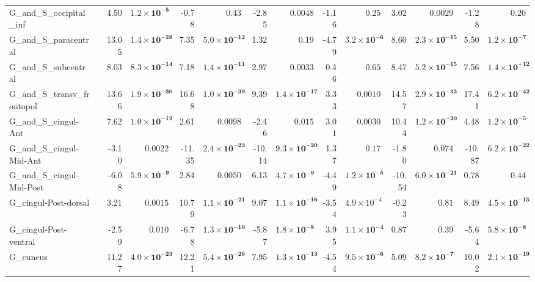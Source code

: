 {\begin{longtable}{llrrrrrrrrrrrr}
G\_and\_S\_occipital\_inf &  & 4.50 & $\mathbf{1.2{\times}10^{-5}}$ & -0.78 & $0.43$ & -2.85 & $0.0048$ & -1.16 & $0.25$ & 3.02 & $0.0029$ & -1.28 & $0.20$ \\
G\_and\_S\_paracentral &  & 13.05 & $\mathbf{1.4{\times}10^{-28}}$ & 7.35 & $\mathbf{5.0{\times}10^{-12}}$ & 1.32 & $0.19$ & -4.79 & $\mathbf{3.2{\times}10^{-6}}$ & 8.60 & $\mathbf{2.3{\times}10^{-15}}$ & 5.50 & $\mathbf{1.2{\times}10^{-7}}$ \\
G\_and\_S\_subcentral &  & 8.03 & $\mathbf{8.3{\times}10^{-14}}$ & 7.18 & $\mathbf{1.4{\times}10^{-11}}$ & 2.97 & $0.0033$ & 0.46 & $0.65$ & 8.47 & $\mathbf{5.2{\times}10^{-15}}$ & 7.56 & $\mathbf{1.4{\times}10^{-12}}$ \\
G\_and\_S\_transv\_frontopol &  & 13.66 & $\mathbf{1.9{\times}10^{-30}}$ & 16.68 & $\mathbf{1.0{\times}10^{-39}}$ & 9.39 & $\mathbf{1.4{\times}10^{-17}}$ & 3.33 & $0.0010$ & 14.57 & $\mathbf{2.9{\times}10^{-33}}$ & 17.41 & $\mathbf{6.2{\times}10^{-42}}$ \\
G\_and\_S\_cingul-Ant &  & 7.62 & $\mathbf{1.0{\times}10^{-12}}$ & 2.61 & $0.0098$ & -2.46 & $0.015$ & 3.01 & $0.0030$ & 10.44 & $\mathbf{1.2{\times}10^{-20}}$ & 4.48 & $\mathbf{1.2{\times}10^{-5}}$ \\
G\_and\_S\_cingul-Mid-Ant &  & -3.10 & $0.0022$ & -11.35 & $\mathbf{2.4{\times}10^{-23}}$ & -10.14 & $\mathbf{9.3{\times}10^{-20}}$ & 1.37 & $0.17$ & -1.80 & $0.074$ & -10.87 & $\mathbf{6.2{\times}10^{-22}}$ \\
G\_and\_S\_cingul-Mid-Post &  & -6.08 & $\mathbf{5.9{\times}10^{-9}}$ & 2.84 & $0.0050$ & 6.13 & $\mathbf{4.7{\times}10^{-9}}$ & -4.49 & $\mathbf{1.2{\times}10^{-5}}$ & -10.54 & $\mathbf{6.0{\times}10^{-21}}$ & 0.78 & $0.44$ \\
G\_cingul-Post-dorsal &  & 3.21 & $0.0015$ & 10.79 & $\mathbf{1.1{\times}10^{-21}}$ & 9.07 & $\mathbf{1.1{\times}10^{-16}}$ & -3.54 & $4.9{\times}10^{-4}$ & -0.23 & $0.81$ & 8.49 & $\mathbf{4.5{\times}10^{-15}}$ \\
G\_cingul-Post-ventral &  & -2.59 & $0.010$ & -6.78 & $\mathbf{1.3{\times}10^{-10}}$ & -5.87 & $\mathbf{1.8{\times}10^{-8}}$ & 3.95 & $\mathbf{1.1{\times}10^{-4}}$ & 0.87 & $0.39$ & -5.64 & $\mathbf{5.8{\times}10^{-8}}$ \\
G\_cuneus &  & 11.27 & $\mathbf{4.0{\times}10^{-23}}$ & 12.21 & $\mathbf{5.4{\times}10^{-26}}$ & 7.95 & $\mathbf{1.3{\times}10^{-13}}$ & -4.54 & $\mathbf{9.5{\times}10^{-6}}$ & 5.09 & $\mathbf{8.2{\times}10^{-7}}$ & 10.02 & $\mathbf{2.1{\times}10^{-19}}$ \\

\end{longtable}}
